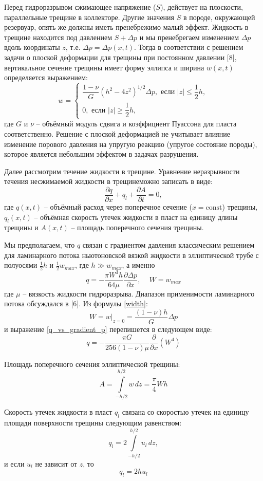 \documentclass[a4paper, 12pt]{article}
\newcommand{\beq}{\begin{equation}}
\newcommand{\eeq}{\end{equation}}
\begin{document}
Перед гидроразрывом сжимающее напряжение ($S$), действует на плоскости, параллельные трещине в коллекторе.
Другие значения $S$ в породе, окружающей резервуар, опять же должны иметь пренебрежимо малый эффект.
Жидкость в трещине находится под давлением $S+\Delta p$ и мы пренебрегаем изменением $\Delta p$ вдоль координаты $z$, т.е. $\Delta p =\Delta p(x,t)$.
Тогда в соответствии с решением задачи о плоской деформации для трещины при постоянном давлении [8], вертикальное сечение трещины имеет форму эллипса и ширина $w(x,t)$ определяется выражением:
\beq\label{width}
w=
\begin{cases}
\dfrac{1-\nu}{G}\left(h^2-4z^2\right)^{1/2}\Delta p,\text{ если }|z|\leqslant\dfrac{1}{2}h,\\[10pt]
0,\text{ если }|z|\geqslant\dfrac{1}{2}h,
\end{cases}
\eeq
где $G$ и $\nu$ -- объёмный модуль сдвига и коэффициент Пуассона для пласта соответственно.
Решение с плоской деформацией не учитывает влияние изменение порового давления на упругую реакцию (упругое состояние породы), которое является небольшим эффектом в задачах разрушения.

Далее рассмотрим течение жидкости в трещине.
Уравнение неразрывности течения несжимаемой жидкости в трещинеможно записать в виде:
\beq\label{Continuity}
\frac{\partial q}{\partial x}+q_l+\frac{\partial A}{\partial t}=0,
\eeq
где $q(x,t)$ -- объёмный расход через поперечное сечение ($x=\textrm{const}$) трещины, $q_l(x,t)$ -- объёмная скорость утечек жидкости в пласт на единицу длины трещины и $A(x,t)$ -- площадь поперечного сечения трещины.

Мы предполагаем, что $q$ связан с градиентом давления классическим решением для ламинарного потока ньютоновской вязкой жидкости в эллиптической трубе с полуосями $\frac{1}{2}h$ и $\frac{1}{2}w_{max}$, где $h\gg w_{max}$, а именно
\beq\label{q_vs_gradient_p}
q=-\frac{\pi W^3h}{64\mu}\frac{\partial\Delta p}{\partial x},\,\,\,\,\,\,\,W=w_{max}
\eeq
где $\mu$ -- вязкость жидкости гидроразрыва. Диапазон применимости ламинарного потока обсуждался в [6].
Из формулы \eqref{width}:
\beq\label{Max_W}
W=w|_{z=0}=\frac{(1-\nu)h}{G}\Delta p
\eeq
и выражение \eqref{q_vs_gradient_p} перепишется в следующем виде:
\beq\label{q_vs_w}
q=-\frac{\pi G}{256(1-\nu)\mu}\frac{\partial}{\partial x}\left(W^4\right)
\eeq

Площадь поперечного сечения эллиптической трещины:
\beq\label{A_area}
A=\int\limits_{-h/2}^{h/2}w\,dz=\frac{\pi}{4}Wh
\eeq

Скорость утечек жидкости в пласт $q_l$ связана со скоростью утечек на единицу площади поверхности трещины следующим равенством:
\beq
q_l=2\int\limits_{-h/2}^{h/2}u_l\,dz,
\eeq
и если $u_l$ не зависит от $z$, то
\beq\label{leak-offs}
q_l=2hu_l
\eeq
\end{document}
